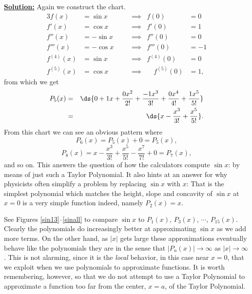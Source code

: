 \underline{\bf Solution:} Again we construct the chart.
\begin{alignat*}{3}
f(x)&=\sin x &\quad&\implies& f(0)&=0\\
f'(x)&=\cos x &&\implies& f'(0)&=1\\
f''(x)&=-\sin x&&\implies& f''(0)&=0\\
f'''(x)&=-\cos x&&\implies& f'''(0)&=-1\\
f^{(4)}(x)&=\sin x&&\implies& f^{(4)}(0)&=0\\
f^{(5)}(x)&=\cos x&&\implies& \quad f^{(5)}(0)&=1,
\end{alignat*}
from which we get
\begin{eqnarray*}
P_5(x)&=&\ds{0+1x+\frac{0x^2}{2!}+\frac{-1x^3}{3!}+\frac{0x^4}{4!}
+\frac{1x^5}{5!}}\\
&=&\ds{x-\frac{x^3}{3!}+\frac{x^5}{5!}}.\end{eqnarray*}
From this chart we can see an obvious  pattern where
$$P_6(x)=P_5(x)+0=P_5(x),$$
$$P_8(x)=x-\frac{x^3}{3!}+\frac{x^5}{5!}-\frac{x^7}{7!}+0=P_7(x),$$
and so on.  
\eex
This answers the question of how the calculators
compute $\sin x$: by means of just such a Taylor Polynomial.
It also hints at an answer for why physicists often simplify
a problem by replacing $\sin x$ with $x$: That is the 
simplest polynomial which matches the height,  slope  and
concavity of  $\sin x$ at $x=0$
is a very simple function indeed, namely $P_2(x)=x$. 

See Figures \ref{sin13}--\ref{sinall} 
to compare $\sin x$ to $P_1(x)$, $P_3(x)$, $\cdots$,
$P_{15}(x)$.  Clearly the polynomials do increasingly better
at approximating $\sin x$ as we add more terms. On the other hand,
as $|x|$ gets large these approximations eventually
behave like the polynomials they 
are in the 
sense that $|P_n(x)|\to\infty$ as $|x|\to\infty$. 
This is not alarming, since it is the {\it local} behavior, in
this case near $x=0$, that we exploit when we use polynomials
to approximate functions. It is worth remembering, however, so
that we do not attempt to use a Taylor Polynomial to approximate
a function too far from the center, $x=a$, of the Taylor Polynomial.


